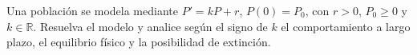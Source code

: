 Una población se modela mediante $P'=kP+r$, $P(0)=P_0$, con $r>0$, $P_0\ge0$ y $k\in\mathbb R$. Resuelva el modelo y analice según el signo de $k$ el comportamiento a largo plazo, el equilibrio físico y la posibilidad de extinción.
